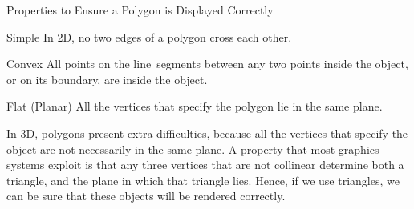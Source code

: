 \documentclass[../notes.tex]{subfiles}
\begin{document}
        \begin{sidenote}{Properties to Ensure a Polygon is Displayed Correctly}
          $ $\vspace{-1em}
          \begin{descriptimize}[nosep]
            \item[Simple] In 2D, no two edges of a polygon cross each other.
            \item[Convex] All points on the line~segments between any two points
              inside the object, or on its boundary, are inside the object.
            \item[Flat (Planar)] All the vertices that specify the polygon lie in the same plane.
          \end{descriptimize}
        \end{sidenote}

        In 3D, polygons present extra difficulties, because all the vertices that
        specify the object are not necessarily in the same plane.
        A property that most graphics systems exploit is that any three vertices
        that are not collinear determine both a triangle,
        and the plane in which that triangle lies.
        Hence, if we use triangles, we can be sure that these objects will be rendered correctly.
\end{document}
